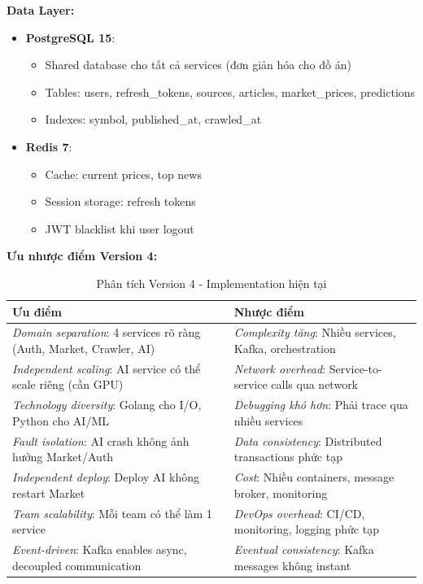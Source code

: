 \noindent\textbf{Data Layer:}
\begin{itemize}
    \item \textbf{PostgreSQL 15}:
    \begin{itemize}
        \item Shared database cho tất cả services (đơn giản hóa cho đồ án)
        \item Tables: users, refresh\_tokens, sources, articles, market\_prices, predictions
        \item Indexes: symbol, published\_at, crawled\_at
    \end{itemize}
    
    \item \textbf{Redis 7}:
    \begin{itemize}
        \item Cache: current prices, top news
        \item Session storage: refresh tokens
        \item JWT blacklist khi user logout
    \end{itemize}
\end{itemize}

\noindent\textbf{Ưu nhược điểm Version 4:}

\begin{table}[H]
\centering
\caption{Phân tích Version 4 - Implementation hiện tại}
\begin{tabular}{|p{6.5cm}|p{6.5cm}|}
\hline
\textbf{Ưu điểm} & \textbf{Nhược điểm} \\
\hline
\textit{Domain separation}: 4 services rõ ràng (Auth, Market, Crawler, AI) & \textit{Complexity tăng}: Nhiều services, Kafka, orchestration \\
\hline
\textit{Independent scaling}: AI service có thể scale riêng (cần GPU) & \textit{Network overhead}: Service-to-service calls qua network \\
\hline
\textit{Technology diversity}: Golang cho I/O, Python cho AI/ML & \textit{Debugging khó hơn}: Phải trace qua nhiều services \\
\hline
\textit{Fault isolation}: AI crash không ảnh hưởng Market/Auth & \textit{Data consistency}: Distributed transactions phức tạp \\
\hline
\textit{Independent deploy}: Deploy AI không restart Market & \textit{Cost}: Nhiều containers, message broker, monitoring \\
\hline
\textit{Team scalability}: Mỗi team có thể làm 1 service & \textit{DevOps overhead}: CI/CD, monitoring, logging phức tạp \\
\hline
\textit{Event-driven}: Kafka enables async, decoupled communication & \textit{Eventual consistency}: Kafka messages không instant \\
\hline
\end{tabular}
\end{table}


